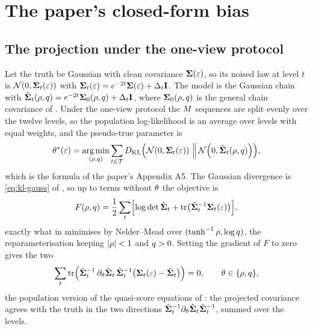 \section{The paper's closed-form bias}
\label{sec:bias}

\subsection{The projection under the one-view protocol}

Let the truth be Gaussian with clean covariance $\mathbf{\Sigma}(\varepsilon)$, so its noised law at
level $t$ is $\mathcal{N}\!\left(0,\mathbf{\Sigma}_t(\varepsilon)\right)$ with $\mathbf{\Sigma}_t(\varepsilon)=e^{-2t}\mathbf{\Sigma}(\varepsilon)+\Delta_t\mathbf{I}$.
The model is the Gaussian chain with $\hat{\mathbf{\Sigma}}_t(\rho,q)=e^{-2t}\mathbf{\Sigma}_0(\rho,q)+\Delta_t\mathbf{I}$,
where $\mathbf{\Sigma}_0(\rho,q)$ is the general chain covariance of
. Under the one-view protocol the $M$ sequences are
split evenly over the twelve levels, so the population log-likelihood is an average
over levels with equal weights, and the pseudo-true parameter is
\begin{equation}
  \theta^\ast(\varepsilon)=\operatorname*{arg\,min}_{(\rho,q)}\sum_{t\in\mathcal T}
  D_{\mathrm{KL}}\Bigl(\mathcal{N}\!\left(0,\mathbf{\Sigma}_t(\varepsilon)\right)\,\Big\|\,\mathcal{N}\!\left(0,\hat{\mathbf{\Sigma}}_t(\rho,q)\right)\Bigr),
  \label{eq:theta-star}
\end{equation}
which is the formula of the paper's Appendix A5. The Gaussian divergence is
\cref{eq:kl-gauss} of , so up to terms without
$\theta$ the objective is
\begin{equation}
  F(\rho,q)=\frac12\sum_t\Bigl[\log\det\hat{\mathbf{\Sigma}}_t+\operatorname{tr}\bigl(\hat{\mathbf{\Sigma}}_t^{-1}\mathbf{\Sigma}_t(\varepsilon)\bigr)\Bigr],
  \label{eq:F}
\end{equation}
exactly what  in  minimises by
Nelder--Mead over $(\tanh^{-1}\rho,\log q)$, the reparameterisation keeping
$|\rho|<1$ and $q>0$. Setting the gradient of $F$ to zero gives the two
\begin{equation}
  \sum_t\operatorname{tr}\Bigl(\hat{\mathbf{\Sigma}}_t^{-1}\,\partial_\theta\hat{\mathbf{\Sigma}}_t\,\hat{\mathbf{\Sigma}}_t^{-1}\bigl(\mathbf{\Sigma}_t(\varepsilon)-\hat{\mathbf{\Sigma}}_t\bigr)\Bigr)=0,
  \qquad\theta\in\{\rho,q\},
  \label{eq:proj-eqs}
\end{equation}
the population version of the quasi-score equations of
: the projected covariance agrees with the truth in the
two directions $\hat{\mathbf{\Sigma}}_t^{-1}\partial_\theta\hat{\mathbf{\Sigma}}_t\hat{\mathbf{\Sigma}}_t^{-1}$, summed over the levels.

